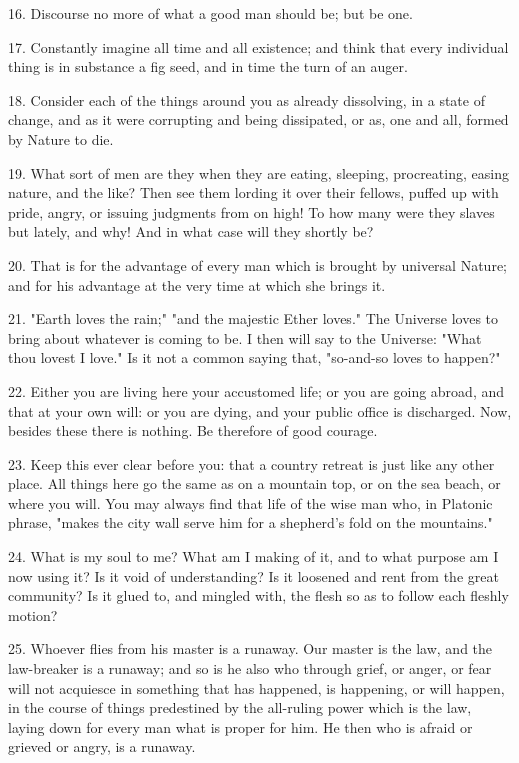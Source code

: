 \documentclass{book}
\begin{document}
16. Discourse no more of what a good man should be; but be one.

17. Constantly imagine all time and all existence; and think that
every individual thing is in substance a fig seed, and in time the
turn of an auger.

18. Consider each of the things around you as already dissolving, in a
state of change, and as it were corrupting and being dissipated, or
as, one and all, formed by Nature to die.

19. What sort of men are they when they are eating, sleeping,
procreating, easing nature, and the like? Then see them lording it
over their fellows, puffed up with pride, angry, or issuing judgments
from on high! To how many were they slaves but lately, and why! And in
what case will they shortly be?

20. That is for the advantage of every man which is brought by
universal Nature; and for his advantage at the very time at which she
brings it.

21. "Earth loves the rain;" "and the majestic Ether loves." The
Universe loves to bring about whatever is coming to be. I then will
say to the Universe: "What thou lovest I love." Is it not a common
saying that, "so-and-so loves to happen?"

22. Either you are living here your accustomed life; or you are going
abroad, and that at your own will: or you are dying, and your public
office is discharged. Now, besides these there is nothing. Be
therefore of good courage.

23. Keep this ever clear before you: that a country retreat is just
like any other place. All things here go the same as on a mountain
top, or on the sea beach, or where you will. You may always find that
life of the wise man who, in Platonic phrase, "makes the city wall
serve him for a shepherd's fold on the mountains."

24. What is my soul to me? What am I making of it, and to what purpose
am I now using it? Is it void of understanding? Is it loosened and
rent from the great community? Is it glued to, and mingled with, the
flesh so as to follow each fleshly motion?

25. Whoever flies from his master is a runaway. Our master is the law,
and the law-breaker is a runaway; and so is he also who through grief,
or anger, or fear will not acquiesce in something that has happened,
is happening, or will happen, in the course of things predestined by
the all-ruling power which is the law, laying down for every man what
is proper for him. He then who is afraid or grieved or angry, is a
runaway.
\end{document}
